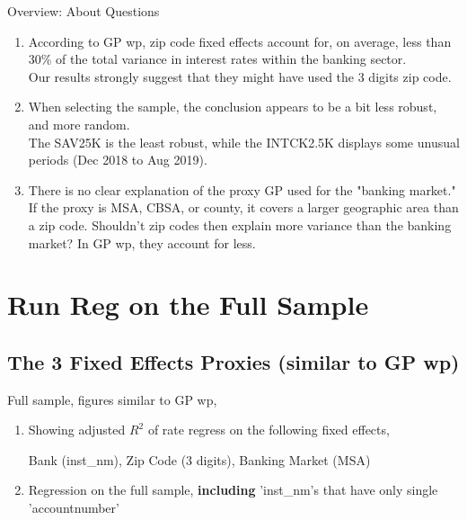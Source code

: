 \documentclass{beamer}
\begin{document}
\begin{frame}{Overview: About Questions}
\begin{enumerate}
        \item According to GP wp, zip code fixed effects account for, on average, less than 30\% of the total variance in interest rates within the banking sector. \\
        Our results strongly suggest that they might have used the 3 digits zip code.
        
        \item When selecting the sample, the conclusion appears to be a bit less robust, and more random.\\
        The SAV25K is the least robust, while the INTCK2.5K displays some unusual periods (Dec 2018 to Aug 2019).
        
        \item There is no clear explanation of the proxy GP used for the "banking market." \\ 
        If the proxy is MSA, CBSA, or county, it covers a larger geographic area than a zip code. Shouldn’t zip codes then explain more variance than the banking market? In GP wp, they account for less.
    \end{enumerate}

\end{frame}


\section{Run Reg on the Full Sample}

\subsection{The 3 Fixed Effects Proxies (similar to GP wp)}

\begin{frame}
    \vfill
    \centering
    { Full sample, figures similar to GP wp,}
    
    \begin{enumerate}
        \item Showing adjusted $R^2$ of rate regress on the following fixed effects, 
            
            Bank (inst\_nm), Zip Code (3 digits), Banking Market (MSA)
        \item Regression on the full sample, {\textbf{including}} 'inst\_nm's that have only single 'accountnumber'
    \end{enumerate}
    \vfill
\end{frame}
\end{document}
